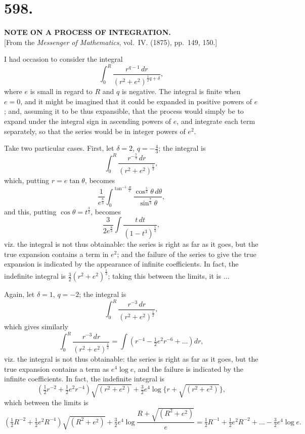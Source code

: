 \documentclass[11pt,a4paper]{book}
\begin{document}
\newpage
\section*{598.}
\begin{center}
{\large\bfseries NOTE ON A PROCESS OF INTEGRATION.}\\[0.5em]
[From the \textit{Messenger of Mathematics}, vol.~IV. (1875), pp.~149, 150.]
\end{center}

I had occasion to consider the integral
\[
\int_0^R \frac{r^{q-1}\,dr}{(r^2+e^2)^{\frac{1}{2}q+\delta}},
\]
where $e$ is small in regard to $R$ and $q$ is negative. The integral is
finite when $e=0$, and it might be imagined that it could be expanded in
positive powers of $e$; and, assuming it to be thus expansible, that the
process would simply be to expand under the integral sign in ascending
powers of $e$, and integrate each term separately, so that the series would
be in integer powers of $e^2$.

Take two particular cases. First, let $\delta=2$, $q=-\tfrac{4}{3}$; the
integral is
\[
\int_0^R \frac{r^{-\frac{7}{3}}\,dr}{(r^2+e^2)^{\frac{1}{3}}},
\]
which, putting $r=e\tan\theta$, becomes
\[
\frac{1}{e^{\frac{8}{3}}} \int_0^{\tan^{-1}\frac{R}{e}}
  \frac{\cos^{\frac{5}{3}}\theta\,d\theta}{\sin^{\frac{7}{3}}\theta},
\]
and this, putting $\cos\theta=t^{\frac{3}{2}}$, becomes
\[
\frac{3}{2e^{\frac{8}{3}}} \int \frac{t\,dt}{(1-t^3)^{\frac{5}{3}}},
\]
viz. the integral is not thus obtainable: the series is right as far as it
goes, but the true expansion contains a term in $e^2$; and the failure of
the series to give the true expansion is indicated by the appearance of
infinite coefficients. In fact, the indefinite integral is
$\tfrac{3}{2}(r^2+e^2)^{\frac{1}{3}}$; taking this between the limits, it is
$\ldots$

Again, let $\delta=1$, $q=-2$; the integral is
\[
\int_0^R \frac{r^{-3}\,dr}{(r^2+e^2)^{\frac{1}{2}}},
\]
which gives similarly
\[
\int_0^R \frac{r^{-3}\,dr}{(r^2+e^2)^{\frac{1}{2}}}
  = \int \left(r^{-4} - \tfrac{1}{2}e^2r^{-6} + \ldots\right)dr,
\]
viz. the integral is not thus obtainable: the series is right as far as it
goes, but the true expansion contains a term as $e^4\log e$, and the failure
is indicated by the infinite coefficients. In fact, the indefinite integral
is
\[
\left(\tfrac{1}{2}r^{-2} + \tfrac{1}{2}e^2r^{-4}\right)\sqrt{(r^2+e^2)}
  + \tfrac{3}{2}e^4\log\{r+\sqrt{(r^2+e^2)}\},
\]
which between the limits is
\[
\left(\tfrac{1}{2}R^{-2} + \tfrac{1}{2}e^2R^{-4}\right)\sqrt{(R^2+e^2)}
  + \tfrac{3}{2}e^4\log\frac{R+\sqrt{(R^2+e^2)}}{e}
  = \tfrac{1}{2}R^{-1} + \tfrac{1}{2}e^2R^{-2} + \ldots
  - \tfrac{3}{2}e^4\log e.
\]
\end{document}
